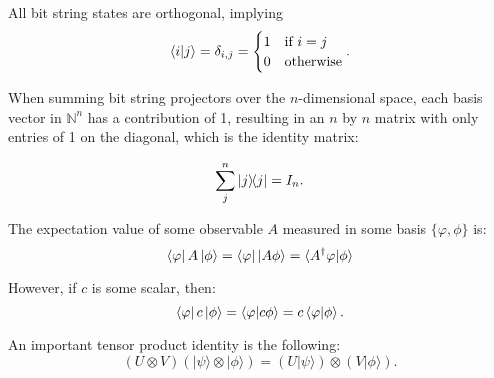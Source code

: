 All bit string states are orthogonal, implying \begin{equation}
\langle i | j \rangle = \delta_{i,j} = \begin{cases}
1& \text{if } i = j\\
    0              & \text{otherwise}
\end{cases}.
\end{equation}

When summing bit string projectors over the $n$-dimensional space, each basis vector in $\mathbb{N}^{n}$ has a contribution of 1,
resulting in an $n$ by $n$ matrix with only entries of 1 on the diagonal, which is the identity matrix:

\begin{equation}
   \sum_{j}^{n} | j \rangle\!\langle j | = I_n.
\end{equation}

The expectation value of some observable $A$ measured in some basis $\{\varphi, \phi\}$ is:
\begin{equation}
\left\langle{\varphi}\right\vert A \left\vert{\phi}\right\rangle = \left\langle{\varphi}\right\vert \left\vert{A\phi}\right\rangle = \langle A^{\dagger}\varphi|\phi \rangle
\end{equation}

However, if $c$ is some scalar, then:
\begin{equation}
\left\langle{\varphi}\right\vert c \left\vert{\phi}\right\rangle = \braket{\varphi}{c \phi} = c \braket{\varphi}{\phi}.
\end{equation}

An important tensor product identity is the following:
\begin{equation}
(U \otimes V)(|\psi\rangle \otimes|\phi\rangle)=(U|\psi\rangle) \otimes(V|\phi\rangle).
\end{equation}

